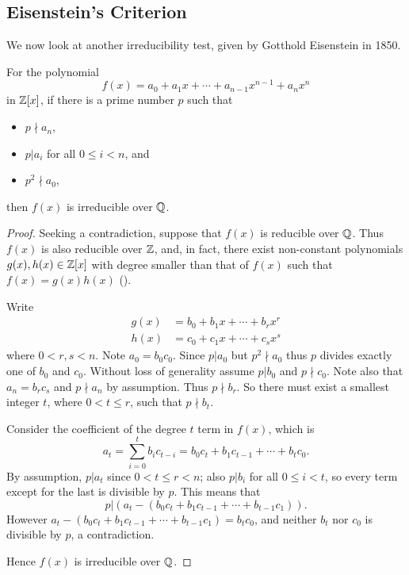 \subsection{Eisenstein's Criterion}
We now look at another irreducibility test, given by Gotthold Eisenstein in 1850.

\newpage

\begin{theorem}\label{thrm-eisenstein-criterion}
    For the polynomial
    \[
        f(x) = a_0 + a_1x + \cdots + a_{n-1}x^{n-1} + a_nx^n
    \]
    in $\mathbb{Z}[x]$, if there is a prime number $p$ such that
    \begin{itemize}
        \item $p \nmid a_n$,
        \item $p \vert a_i$ for all $0 \leq i < n$, and
        \item $p^2 \nmid a_0$,
    \end{itemize}
    then $f(x)$ is irreducible over $\mathbb{Q}$.
\end{theorem}
\begin{proof}
    Seeking a contradiction, suppose that $f(x)$ is reducible over $\mathbb{Q}$. Thus $f(x)$ is also reducible over $\mathbb{Z}$, and, in fact, there exist non-constant polynomials $g(x),h(x) \in \mathbb{Z}[x]$ with degree smaller than that of $f(x)$ such that $f(x) = g(x)h(x)$ ().

    Write
    \begin{align*}
        g(x) &= b_0 + b_1x + \cdots + b_rx^r\\
        h(x) &= c_0 + c_1x + \cdots + c_sx^s
    \end{align*}
    where $0 < r, s < n$. Note $a_0 = b_0c_0$. Since $p \vert a_0$ but $p^2 \nmid a_0$ thus $p$ divides exactly one of $b_0$ and $c_0$. Without loss of generality assume $p \vert b_0$ and $p \nmid c_0$. Note also that $a_n = b_rc_s$ and $p \nmid a_n$ by assumption. Thus $p \nmid b_r$. So there must exist a smallest integer $t$, where $0 < t \leq r$, such that $p \nmid b_t$.

    Consider the coefficient of the degree $t$ term in $f(x)$, which is
    \[
        a_t = \sum_{i=0}^tb_ic_{t-i} = b_0c_t + b_1c_{t-1} + \cdots + b_tc_0.
    \]
    By assumption, $p \vert a_t$ since $0 < t \leq r < n$; also $p \vert b_i$ for all $0 \leq i < t$, so every term except for the last is divisible by $p$. This means that
    \[
        p \vert (a_t - (b_0c_t + b_1c_{t-1} + \cdots + b_{t-1}c_1)).
    \]
    However $a_t - (b_0c_t + b_1c_{t-1} + \cdots + b_{t-1}c_1) = b_tc_0$, and neither $b_t$ nor $c_0$ is divisible by $p$, a contradiction.

    Hence $f(x)$ is irreducible over $\mathbb{Q}$.
\end{proof}

